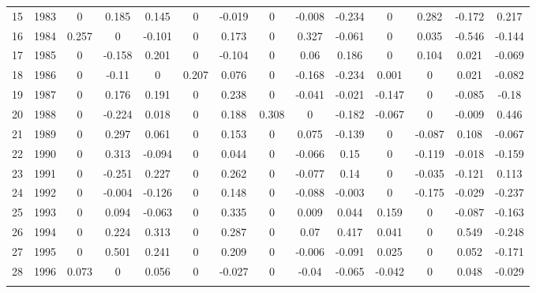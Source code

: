 \begin{table}[!htbp]
\begin{tabular}{@{\extracolsep{5pt}} cccccccccccccc}
15 & 1983 & 0 & 0.185 & 0.145 & 0 & -0.019 & 0 & -0.008 & -0.234 & 0 & 0.282 & -0.172 & 0.217 \\ 
16 & 1984 & 0.257 & 0 & -0.101 & 0 & 0.173 & 0 & 0.327 & -0.061 & 0 & 0.035 & -0.546 & -0.144 \\ 
17 & 1985 & 0 & -0.158 & 0.201 & 0 & -0.104 & 0 & 0.06 & 0.186 & 0 & 0.104 & 0.021 & -0.069 \\ 
18 & 1986 & 0 & -0.11 & 0 & 0.207 & 0.076 & 0 & -0.168 & -0.234 & 0.001 & 0 & 0.021 & -0.082 \\ 
19 & 1987 & 0 & 0.176 & 0.191 & 0 & 0.238 & 0 & -0.041 & -0.021 & -0.147 & 0 & -0.085 & -0.18 \\ 
20 & 1988 & 0 & -0.224 & 0.018 & 0 & 0.188 & 0.308 & 0 & -0.182 & -0.067 & 0 & -0.009 & 0.446 \\ 
21 & 1989 & 0 & 0.297 & 0.061 & 0 & 0.153 & 0 & 0.075 & -0.139 & 0 & -0.087 & 0.108 & -0.067 \\ 
22 & 1990 & 0 & 0.313 & -0.094 & 0 & 0.044 & 0 & -0.066 & 0.15 & 0 & -0.119 & -0.018 & -0.159 \\ 
23 & 1991 & 0 & -0.251 & 0.227 & 0 & 0.262 & 0 & -0.077 & 0.14 & 0 & -0.035 & -0.121 & 0.113 \\ 
24 & 1992 & 0 & -0.004 & -0.126 & 0 & 0.148 & 0 & -0.088 & -0.003 & 0 & -0.175 & -0.029 & -0.237 \\ 
25 & 1993 & 0 & 0.094 & -0.063 & 0 & 0.335 & 0 & 0.009 & 0.044 & 0.159 & 0 & -0.087 & -0.163 \\ 
26 & 1994 & 0 & 0.224 & 0.313 & 0 & 0.287 & 0 & 0.07 & 0.417 & 0.041 & 0 & 0.549 & -0.248 \\ 
27 & 1995 & 0 & 0.501 & 0.241 & 0 & 0.209 & 0 & -0.006 & -0.091 & 0.025 & 0 & 0.052 & -0.171 \\ 
28 & 1996 & 0.073 & 0 & 0.056 & 0 & -0.027 & 0 & -0.04 & -0.065 & -0.042 & 0 & 0.048 & -0.029 \\ 
\hline \\[-1.8ex] 
\end{tabular} 
\end{table} 
